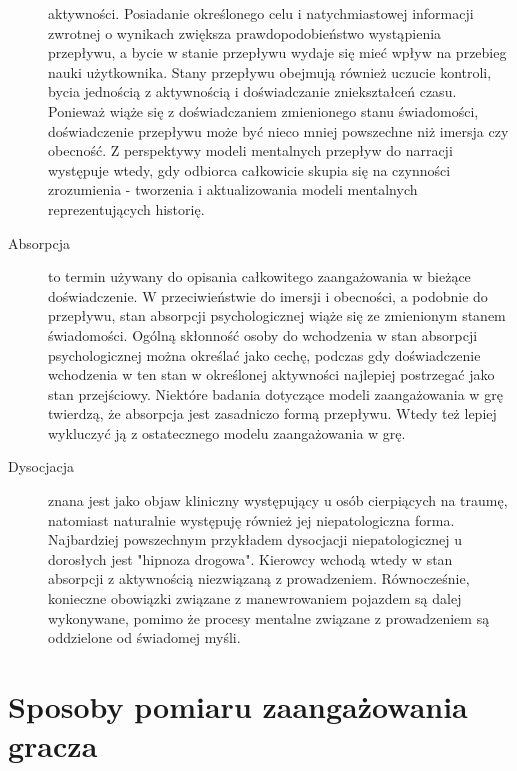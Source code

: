 \begin{description}
            aktywności\cite{development_of_game}. Posiadanie określonego celu i natychmiastowej informacji zwrotnej o wynikach zwiększa
            prawdopodobieństwo wystąpienia przepływu, a bycie w stanie przepływu wydaje się mieć wpływ na przebieg nauki
            użytkownika. Stany przepływu obejmują również uczucie kontroli, bycia jednością z aktywnością i doświadczanie
            zniekształceń czasu. Ponieważ wiąże się z doświadczaniem zmienionego stanu świadomości, doświadczenie
            przepływu może być nieco mniej powszechne niż imersja czy obecność\cite{development_of_game}. Z perspektywy modeli mentalnych
            przepływ do narracji występuje wtedy, gdy odbiorca całkowicie skupia się na czynności zrozumienia -
            tworzenia i aktualizowania modeli mentalnych reprezentujących historię\cite{measuring_narrative}.
      \item[Absorpcja] to termin używany do opisania całkowitego zaangażowania w bieżące doświadczenie. W
            przeciwieństwie do imersji i obecności, a podobnie do przepływu, stan absorpcji psychologicznej
            wiąże się ze zmienionym stanem świadomości\cite{development_of_game}. Ogólną skłonność osoby do wchodzenia
            w stan absorpcji psychologicznej można określać jako cechę, podczas gdy doświadczenie
            wchodzenia w ten stan w określonej aktywności najlepiej postrzegać jako stan przejściowy\cite{development_of_game}.
            Niektóre badania dotyczące modeli zaangażowania w grę twierdzą, że absorpcja jest zasadniczo formą
            przepływu. Wtedy też lepiej wykluczyć ją z ostatecznego modelu zaangażowania w grę\cite{eng_in_games}.
      \item[Dysocjacja] znana jest jako objaw kliniczny występujący u osób cierpiących na traumę, natomiast
            naturalnie występuję również jej niepatologiczna forma\cite{development_of_game}.
            Najbardziej powszechnym przykładem dysocjacji niepatologicznej u dorosłych jest "hipnoza drogowa".
            Kierowcy wchodą wtedy w stan absorpcji z aktywnością niezwiązaną z prowadzeniem.
            Równocześnie, konieczne obowiązki związane z manewrowaniem
            pojazdem są dalej wykonywane, pomimo że procesy mentalne związane z prowadzeniem są oddzielone
            od świadomej myśli\cite{development_of_game}.
\end{description}

\section{Sposoby pomiaru zaangażowania gracza}\label{section:ch3_2}

